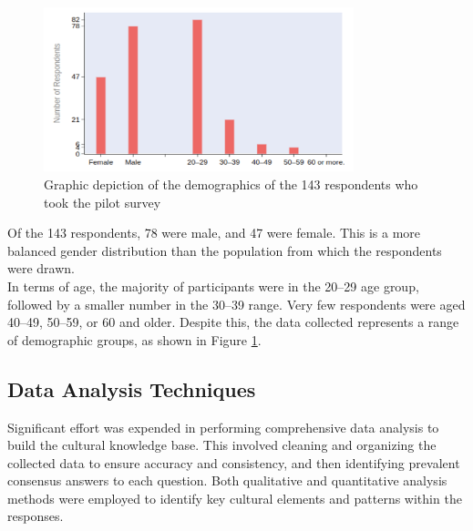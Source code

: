 \documentclass{CSSRforAfrica}
\begin{document}
\begin{figure}[t]
\begin{center}
\includegraphics[width=90mm,angle=0]{demographics.png}
\end{center}
\vspace{-5mm}
\caption{Graphic depiction of the demographics of the 143 respondents who took the pilot survey}
\label{fig:demographics}       
\end{figure}

Of the 143 respondents, 78 were male, and 47 were female. This is a more balanced gender distribution than the population from which the respondents were drawn. \\

\noindent In terms of age, the majority of participants were in the 20–29 age group, followed by a smaller number in the 30–39 range. Very few respondents were aged 40–49, 50–59, or 60 and older. Despite this, the data collected represents a range of demographic groups, as shown in Figure \ref{fig:demographics}.

\subsection{Data Analysis Techniques}
\label{section:data_analysis}

Significant effort was expended in performing  comprehensive data analysis to build the cultural knowledge base. This involved cleaning and organizing the collected data to ensure accuracy and consistency, and then identifying prevalent consensus answers to each question. Both qualitative and quantitative analysis methods were employed to identify key cultural elements and patterns within the responses. 
\end{document}
